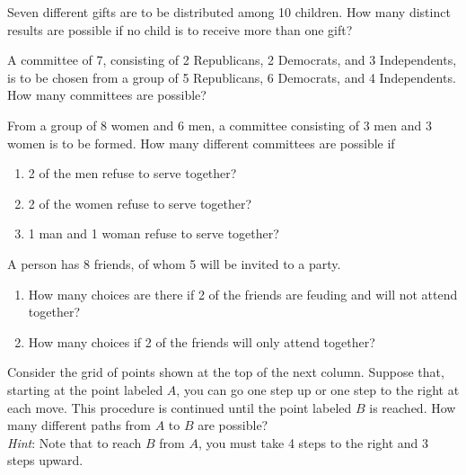 \documentclass[12pt]{article}
\newenvironment{problem}[2][Problem]{\begin{trivlist}
\item[\hskip \labelsep {\bfseries #1}\hskip \labelsep {\bfseries #2.}]}{\end{trivlist}}
\begin{document}
\begin{problem}{ 1.17 }
Seven different gifts are to be distributed among 10 children. How many distinct results are possible if no child is to receive more than one gift?
\end{problem}


\begin{problem}{1.18}
A committee of 7, consisting of 2 Republicans, 2 Democrats, and 3 Independents, is to be chosen from a group of 5 Republicans, 6 Democrats, and 4 Independents. How many committees are possible?
\end{problem}



\begin{problem}{  1.19 }
From a group of 8 women and 6 men, a committee consisting of 3 men and 3 women is to be formed. How many different committees are possible if
\begin{enumerate}[label=(\alph*)]
	\item 2 of the men refuse to serve together?
	\item 2 of the women refuse to serve together?
	\item 1 man and 1 woman refuse to serve together?
\end{enumerate}
\end{problem}




\begin{problem}{  1.20 }
A person has 8 friends, of whom 5 will be invited to a party.
\begin{enumerate}[label=(\alph*)]
	\item How many choices are there if 2 of the friends are feuding and will not attend together?
	\item How many choices if 2 of the friends will only attend together?
\end{enumerate}
\end{problem}



\begin{problem}{  1.21 }
Consider the grid of points shown at the top of the next column. Suppose that, starting at the point labeled $A$, you can go one step up or one step to the right at each move. This procedure is continued until the point labeled $B$ is reached. How many different paths from $A$ to $B$ are possible?\\
\textit{Hint}: Note that to reach $B$ from $A$, you must take 4 steps to the right and 3 steps upward.
\end{problem}
\end{document}
